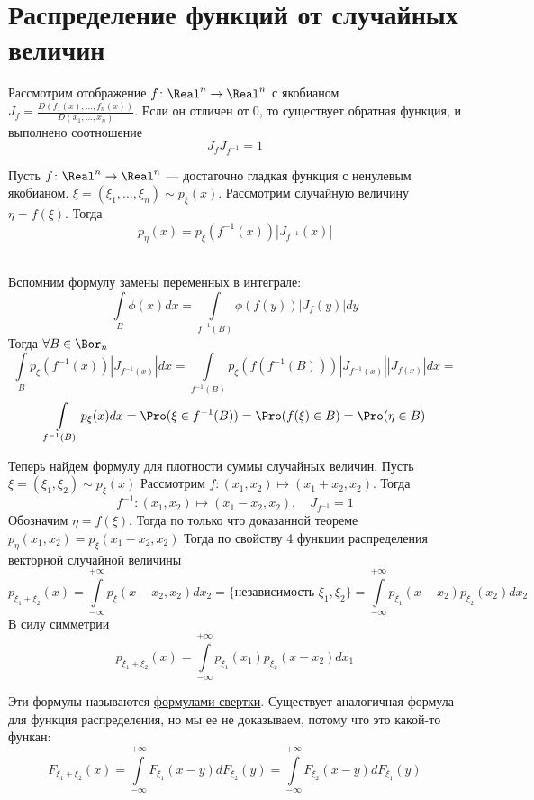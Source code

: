 \section{Распределение функций от случайных величин}
Рассмотрим отображение $f\colon \Real^n \to \Real^n$ с якобианом $J_f = \frac{D(f_1(x), \ldots, f_n(x))}{D(x_1, \ldots, x_n)}$.
Если он отличен от 0, то существует обратная функция, и выполнено соотношение
$$J_fJ_{f^{-1}} = 1$$

\begin{Th}
Пусть  $f\colon \Real^n \to \Real^n$ --- достаточно гладкая функция с ненулевым якобианом. $\xi = (\xi_1, \ldots, \xi_n) \sim p_\xi(x)$. Рассмотрим случайную величину $\eta = f(\xi)$. Тогда
$$p_\eta(x) = p_\xi(f^{-1}(x))|J_{f^{-1}}(x)|$$
\end{Th}
\begin{Proof} \\
Вспомним формулу замены переменных в интеграле:
$$\int\limits_B \phi(x)dx = \int\limits_{f^{-1}(B)} \phi(f(y))|J_f(y)|dy$$
Тогда $\forall B \in \Bor_n$
$$\int\limits_B p_\xi(f^{-1}(x))|J_{f^{-1}(x)}|dx = \int\limits_{f^{-1}(B)} p_\xi(f(f^{-1}(B)))|J_{f^{-1}(x)}||J_{f(x)}|dx =$$
$$ \int\limits_{f^{-1}(B)}p_\xi(x)dx = \Pro(\xi \in f^{-1}(B)) =\Pro(f(\xi) \in B) = \Pro(\eta \in B)$$
\end{Proof}

Теперь найдем формулу для плотности суммы случайных величин.
Пусть $\xi = (\xi_1, \xi_2) \sim p_\xi(x)$
Рассмотрим $f\colon (x_1, x_2) \mapsto (x_1 + x_2, x_2)$. Тогда $$f^{-1} \colon (x_1, x_2) \mapsto (x_1 - x_2, x_2), \quad J_{f^{-1}}=1$$
Обозначим $\eta = f(\xi)$. Тогда по только что доказанной теореме 
$p_\eta(x_1, x_2) = p_{\xi}(x_1 - x_2, x_2)$
Тогда по свойству 4 функции распределения векторной случайной величины
$$p_{\xi_1 + \xi_2}(x) = \int\limits_{-\infty}^{+\infty}p_\xi(x-x_2, x_2)dx_2 = \text{\{независимость $\xi_1, \xi_2$\}} = \int\limits_{-\infty}^{+\infty}p_{\xi_1}(x-x_2)p_{\xi_2}(x_2)dx_2$$
В силу симметрии 
$$p_{\xi_1 + \xi_2}(x) = \int\limits_{-\infty}^{+\infty}p_{\xi_1}(x_1)p_{\xi_2}(x - x_2)dx_1$$

Эти формулы называются \underline{формулами свертки}. Существует аналогичная формула для функция распределения, но мы ее не доказываем, потому что это какой-то функан:
$$F_{\xi_1 + \xi_2}(x) = \int\limits_{-\infty}^{+\infty}F_{\xi_1}(x-y)dF_{\xi_2}(y) = \int\limits_{-\infty}^{+\infty}F_{\xi_2}(x-y)dF_{\xi_1}(y)$$

\newpage

